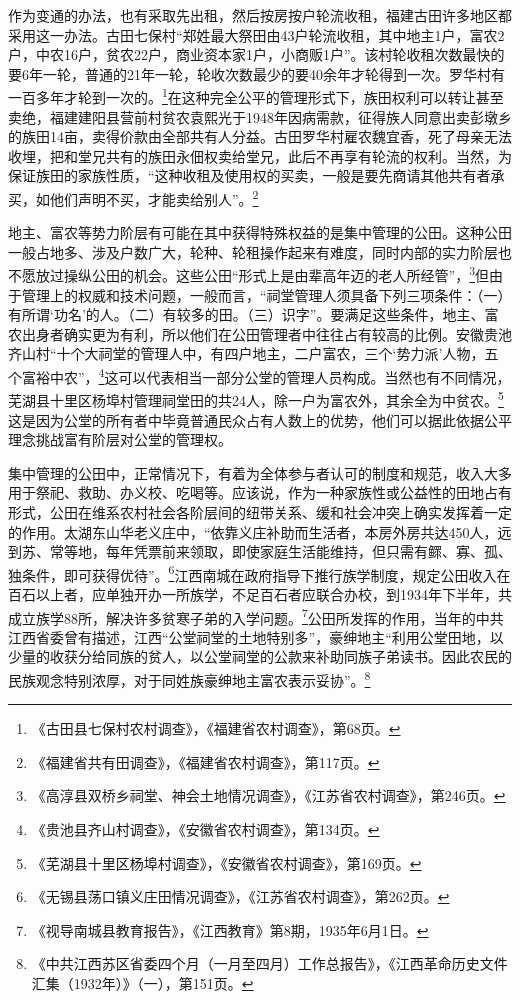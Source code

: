 作为变通的办法，也有采取先出租，然后按房按户轮流收租，福建古田许多地区都采用这一办法。古田七保村“郑姓最大祭田由43户轮流收租，其中地主1户，富农2户，中农16户，贫农22户，商业资本家1户，小商贩1户”。该村轮收租次数最快的要6年一轮，普通的21年一轮，轮收次数最少的要40余年才轮得到一次。罗华村有一百多年才轮到一次的。\footnote{《古田县七保村农村调查》，《福建省农村调查》，第68页。}在这种完全公平的管理形式下，族田权利可以转让甚至卖绝，福建建阳县营前村贫农袁熙光于1948年因病需款，征得族人同意出卖彭墩乡的族田14亩，卖得价款由全部共有人分益。古田罗华村雇农魏宜香，死了母亲无法收埋，把和堂兄共有的族田永佃权卖给堂兄，此后不再享有轮流的权利。当然，为保证族田的家族性质，“这种收租及使用权的买卖，一般是要先商请其他共有者承买，如他们声明不买，才能卖给别人”。\footnote{《福建省共有田调查》，《福建省农村调查》，第117页。}


地主、富农等势力阶层有可能在其中获得特殊权益的是集中管理的公田。这种公田一般占地多、涉及户数广大，轮种、轮租操作起来有难度，同时内部的实力阶层也不愿放过操纵公田的机会。这些公田“形式上是由辈高年迈的老人所经管”，\footnote{《高淳县双桥乡祠堂、神会土地情况调查》，《江苏省农村调查》，第246页。}但由于管理上的权威和技术问题，一般而言，“祠堂管理人须具备下列三项条件：（一）有所谓‘功名’的人。（二）有较多的田。（三）识字”。要满足这些条件，地主、富农出身者确实更为有利，所以他们在公田管理者中往往占有较高的比例。安徽贵池齐山村“十个大祠堂的管理人中，有四户地主，二户富农，三个‘势力派’人物，五个富裕中农”，\footnote{《贵池县齐山村调查》，《安徽省农村调查》，第134页。}这可以代表相当一部分公堂的管理人员构成。当然也有不同情况，芜湖县十里区杨埠村管理祠堂田的共24人，除一户为富农外，其余全为中贫农。\footnote{《芜湖县十里区杨埠村调查》，《安徽省农村调查》，第169页。}这是因为公堂的所有者中毕竟普通民众占有人数上的优势，他们可以据此依据公平理念挑战富有阶层对公堂的管理权。


集中管理的公田中，正常情况下，有着为全体参与者认可的制度和规范，收入大多用于祭祀、救助、办义校、吃喝等。应该说，作为一种家族性或公益性的田地占有形式，公田在维系农村社会各阶层间的纽带关系、缓和社会冲突上确实发挥着一定的作用。太湖东山华老义庄中，“依靠义庄补助而生活者，本房外房共达450人，远到苏、常等地，每年凭票前来领取，即使家庭生活能维持，但只需有鳏、寡、孤、独条件，即可获得优待”。\footnote{《无锡县荡口镇义庄田情况调查》，《江苏省农村调查》，第262页。}江西南城在政府指导下推行族学制度，规定公田收入在百石以上者，应单独开办一所族学，不足百石者应联合办校，到1934年下半年，共成立族学88所，解决许多贫寒子弟的入学问题。\footnote{《视导南城县教育报告》，《江西教育》第8期，1935年6月1日。}公田所发挥的作用，当年的中共江西省委曾有描述，江西“公堂祠堂的土地特别多”，豪绅地主“利用公堂田地，以少量的收获分给同族的贫人，以公堂祠堂的公款来补助同族子弟读书。因此农民的民族观念特别浓厚，对于同姓族豪绅地主富农表示妥协”。\footnote{《中共江西苏区省委四个月（一月至四月）工作总报告》，《江西革命历史文件汇集（1932年）》（一），第151页。}



